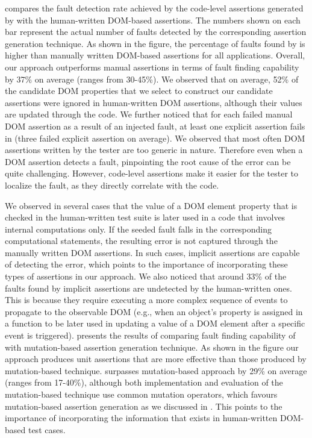  compares the fault detection rate achieved by the code-level assertions generated by \tool with the human-written DOM-based assertions. The numbers shown on each bar represent the actual number of faults detected by the corresponding assertion generation technique. As shown in the figure, the percentage of faults found by \tool is higher than manually written DOM-based assertions for all applications. Overall, our approach outperforms manual assertions in terms of fault finding capability by 37\% on average (ranges from 30-45\%). We observed that on average, 52\% of the candidate DOM properties that we select to construct our candidate assertions were ignored in human-written DOM assertions, although their values are updated through the \javascript code.
We further noticed that for each failed manual DOM assertion as a result of an injected fault, at least one explicit assertion fails in \tool (three failed explicit assertion on average).
We observed that most often DOM assertions written by the tester are too generic in nature. Therefore even when a DOM assertion detects a \javascript fault, pinpointing the root cause of the error can be quite challenging. However, code-level assertions make it easier for the tester to localize the fault, as they directly correlate with the code.

We observed in several cases that the value of a DOM element property that is checked in the human-written test suite is later used in a \javascript code that involves internal computations only. If the seeded fault falls in the corresponding computational statements, the resulting error is not captured through the manually written DOM assertions. In such cases, implicit assertions are capable of detecting the error, which points to the importance of incorporating these types of assertions in our approach. We also noticed that around 33\% of the faults found by implicit assertions are undetected by the human-written ones. This is because they require executing a more complex sequence of events to propagate to the observable DOM (e.g., when an object's property is assigned in a function to be later used in updating a value of a DOM element after a specific event is triggered).    
 presents the results of comparing fault finding capability of \tool with mutation-based assertion generation technique. As shown in the figure our approach produces unit assertions that are more effective than those produced by mutation-based technique. \tool surpasses mutation-based approach by 29\% on average (ranges from 17-40\%), although both implementation and evaluation of the mutation-based technique use common mutation operators, which favours mutation-based assertion generation as we discussed in . This points to the importance of incorporating the information that exists in human-written DOM-based test cases.       


